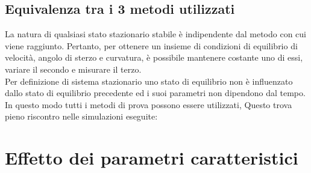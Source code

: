 \subsection{Equivalenza tra i 3 metodi utilizzati}
La natura di qualsiasi stato stazionario stabile è indipendente dal metodo con cui viene raggiunto. Pertanto, per ottenere un insieme  di condizioni di equilibrio di velocità, angolo di sterzo e curvatura, è possibile mantenere costante uno di essi, variare il secondo e misurare il terzo.\\ 
Per definizione di sistema stazionario uno stato di equilibrio non è influenzato dallo stato di equilibrio precedente ed i suoi parametri non dipendono dal tempo. 
In questo modo tutti i metodi di prova possono essere utilizzati, Questo trova pieno riscontro nelle simulazioni eseguite:\\

\section{Effetto dei parametri caratteristici}

